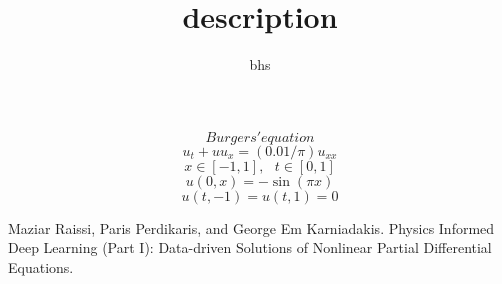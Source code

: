 \documentclass[12pt]{amsart}
\title{description}
\author{bhs}
\begin{document}
\maketitle


$$Burgers' equation$$
$$ u_t + u u_x = (0.01/\pi) u_{xx}$$
$$x \in [-1,1],\ \ \ t \in [0,1]$$
$$u(0,x) = -\sin(\pi x)$$
$$u(t,-1) = u(t,1) = 0$$




\begin{thebibliography}{10}
 Maziar Raissi, Paris Perdikaris, and George Em Karniadakis. Physics Informed Deep Learning (Part I): Data-driven Solutions of Nonlinear Partial Differential Equations.
\end{thebibliography}
\end{document}
